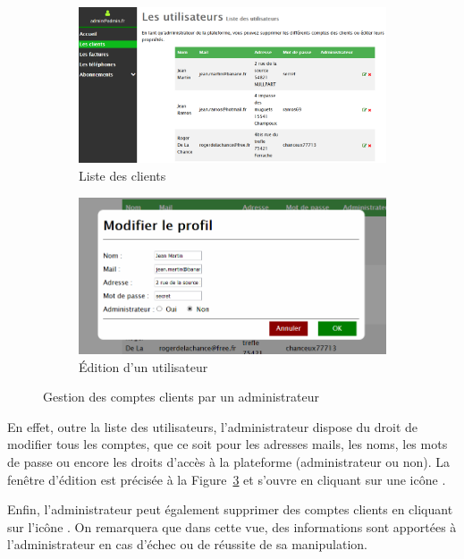 \begin{figure}[ht]
  \centering
  \begin{subfigure}{.65\textwidth}
    \centering
    \includegraphics[width=.95\textwidth]{images/Plateforme/liste_utilisateurs}
    \caption{Liste des clients}
    \label{fig:listeusers}
  \end{subfigure}\hfill%
  \begin{subfigure}{.35\textwidth}
    \centering
    \includegraphics[width=.95\textwidth]{images/Plateforme/vue_edition_clients}
    \caption{\'Edition d'un utilisateur}
    \label{fig:editionuser}
  \end{subfigure}
  \caption{Gestion des comptes clients par un administrateur}
\end{figure}

En effet, outre la liste des utilisateurs, l'administrateur dispose du droit de modifier tous les comptes, que ce soit pour les adresses mails, les noms, les mots de passe ou encore les droits d'accès à la plateforme (administrateur ou non). La fenêtre d'édition est précisée à la Figure~\ref{fig:editionuser} et s'ouvre en cliquant sur une icône \vColor{\faEdit}.

Enfin, l'administrateur peut également supprimer des comptes clients en cliquant sur l'icône \thColor{\faRemove}. On remarquera que dans cette vue, des informations sont apportées à l'administrateur en cas d'échec ou de réussite de sa manipulation.

